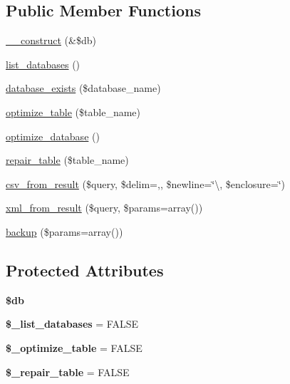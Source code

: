 \subsection*{Public Member Functions}
\begin{DoxyCompactItemize}
\item 
\mbox{\hyperlink{class_c_i___d_b__utility_a319c5b270bc28b50011b82cb473e4108}{\+\_\+\+\_\+construct}} (\&\$db)
\item 
\mbox{\hyperlink{class_c_i___d_b__utility_a7071e8e5c8a4c6daa673a14a36007ef3}{list\+\_\+databases}} ()
\item 
\mbox{\hyperlink{class_c_i___d_b__utility_a974c970c84ea92a49f703c81adfa2238}{database\+\_\+exists}} (\$database\+\_\+name)
\item 
\mbox{\hyperlink{class_c_i___d_b__utility_ac55a0b04bd9408f4b0390320513874b7}{optimize\+\_\+table}} (\$table\+\_\+name)
\item 
\mbox{\hyperlink{class_c_i___d_b__utility_a15b368747604ffe404381f0fc501f27f}{optimize\+\_\+database}} ()
\item 
\mbox{\hyperlink{class_c_i___d_b__utility_a150e0ea9435f62e905b96a600ebf96b6}{repair\+\_\+table}} (\$table\+\_\+name)
\item 
\mbox{\hyperlink{class_c_i___d_b__utility_ab89cd3c3eb851394b13589ce55dd8ac9}{csv\+\_\+from\+\_\+result}} (\$query, \$delim=\textquotesingle{},\textquotesingle{}, \$newline=\char`\"{}\textbackslash{}, \$enclosure=\textquotesingle{}\char`\"{}\textquotesingle{})
\item 
\mbox{\hyperlink{class_c_i___d_b__utility_a7d509e6257a95658bbe4ecfce73d9577}{xml\+\_\+from\+\_\+result}} (\$query, \$params=array())
\item 
\mbox{\hyperlink{class_c_i___d_b__utility_ab993a335f089f7aeccc2ae9aa076be4e}{backup}} (\$params=array())
\end{DoxyCompactItemize}
\subsection*{Protected Attributes}
\begin{DoxyCompactItemize}
\item 
\mbox{\label{class_c_i___d_b__utility_a276cad19321ceb6d0b33010946acb8c9}} 
{\bfseries \$db}
\item 
\mbox{\label{class_c_i___d_b__utility_a785432d54821845986c2559a327c710b}} 
{\bfseries \$\+\_\+list\+\_\+databases} = F\+A\+L\+SE
\item 
\mbox{\label{class_c_i___d_b__utility_ab99b3f999c4e19caedd6611558ea1678}} 
{\bfseries \$\+\_\+optimize\+\_\+table} = F\+A\+L\+SE
\item 
\mbox{\label{class_c_i___d_b__utility_a2252d0018f41ca5d7a0011706bdaf749}} 
{\bfseries \$\+\_\+repair\+\_\+table} = F\+A\+L\+SE
\end{DoxyCompactItemize}


